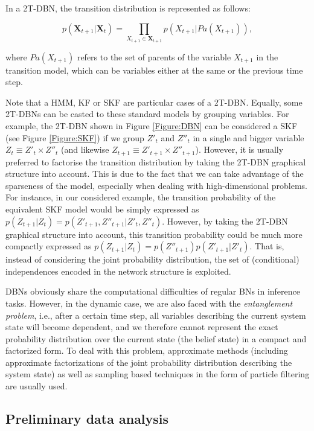 In a 2T-DBN, the transition distribution is represented as follows:

$$ p(\bm X_{t+1} | \bm X_t) = \prod_{X_{t+1}\in\bm X_{t+1}} p(X_{t+1}|Pa(X_{t+1})),$$ 

\noindent where $Pa(X_{t+1})$ refers to the set of parents of the variable $X_{t+1}$ in the transition model, which can be variables either at the same or the previous time step. 

Note that a HMM, KF or SKF are particular cases of a 2T-DBN. Equally, some 2T-DBNs can be casted to these standard models by grouping variables. For example, the 2T-DBN shown in Figure \ref{Figure:DBN} can be considered a SKF (see Figure \ref{Figure:SKF}) if we group $Z'_t$ and $Z''_t$ in a single and bigger variable $Z_t \equiv Z'_t \times Z''_t $ (and likewise $Z_{t+1} \equiv Z'_{t+1} \times Z''_{t+1} $). However, it is usually preferred to factorise the transition distribution by taking the 2T-DBN graphical structure into account. This is due to the fact that we can take advantage of the sparseness of the model, especially when dealing with high-dimensional problems. For instance, in our considered example, the transition probability of the equivalent SKF model would be simply expressed as $p(Z_{t+1}|Z_t) = p(Z'_{t+1},Z''_{t+1}|Z'_t,Z''_t) $. However, by taking the 2T-DBN graphical structure into account, this transition probability could be much more compactly expressed as $p(Z_{t+1}|Z_t)=p(Z''_{t+1})p(Z'_{t+1}|Z'_t)$. That is, instead of considering the joint probability distribution, the set of (conditional) independences encoded in the network structure is exploited.

DBNs obviously share the computational difficulties of regular BNs in inference tasks. However, in the dynamic case, we are also faced with the \textit{entanglement problem}, i.e., after a certain time step, all variables describing the current system state will become dependent, and we therefore cannot represent the exact probability distribution over the current state (the belief state) in a compact and factorized form. To deal with this problem, approximate methods (including approximate factorizations of the joint probability distribution describing the system state) \cite{BoyenKoller1998} as well as sampling based techniques in the form of particle filtering \cite{Doucet2000} are usually used.

\subsection{Preliminary data analysis}\label{SubSection:DataAnalysis}

